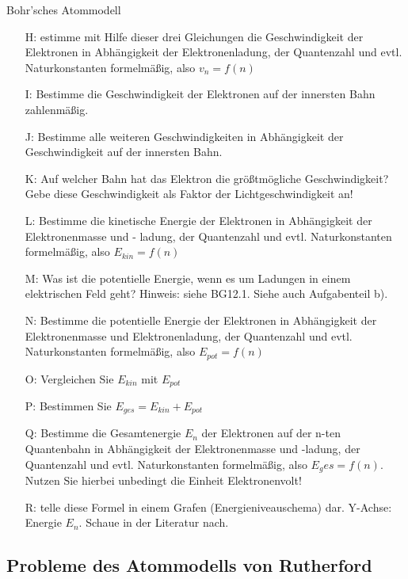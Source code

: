 \documentclass[11pt,a4paper,oneside]{article}
\begin{document}
\begin{aufgabe}{Bohr'sches Atommodell}
\begin{itemize}[left=20mm]
\begin{itemize}[left=-10mm]
				\item [H:] estimme mit Hilfe dieser drei Gleichungen die Geschwindigkeit der Elektronen in Abhängigkeit der Elektronenladung, der Quantenzahl und evtl. Naturkonstanten formelmäßig, also $v_n = f(n)$
				\item [I:] Bestimme die Geschwindigkeit der Elektronen auf der innersten Bahn zahlenmäßig.
				\item [J:] Bestimme alle weiteren Geschwindigkeiten in Abhängigkeit der Geschwindigkeit auf der innersten Bahn.
			    \item [K:] Auf welcher Bahn hat das Elektron die größtmögliche Geschwindigkeit? Gebe diese Geschwindigkeit als Faktor der Lichtgeschwindigkeit an!
				\item [L:] Bestimme die kinetische Energie der Elektronen in Abhängigkeit der Elektronenmasse und -
				ladung, der Quantenzahl und evtl. Naturkonstanten formelmäßig, also $E_{kin} = f(n)$
				
				\newpage
				
				\item [M:] Was ist die potentielle Energie, wenn es um Ladungen in einem elektrischen Feld geht? Hinweis:
				siehe BG12.1. Siehe auch Aufgabenteil b).
				\item [N:] Bestimme die potentielle Energie der Elektronen in Abhängigkeit der Elektronenmasse und Elektronenladung, der Quantenzahl und evtl. Naturkonstanten formelmäßig, also $E_{pot} = f(n)$
				\item [O:] Vergleichen Sie $E_{kin}$ mit $E_{pot}$
				\item [P:] Bestimmen Sie $E_{ges} = E_{kin} + E_{pot}$ 
				\item [Q:] Bestimme die Gesamtenergie $E_n$ der Elektronen auf der n-ten Quantenbahn in Abhängigkeit der
				Elektronenmasse und -ladung, der Quantenzahl und evtl. Naturkonstanten formelmäßig, also $E_ges = f(n)$. Nutzen Sie hierbei unbedingt die Einheit Elektronenvolt!
				\item [R:] telle diese Formel in einem Grafen (Energieniveauschema) dar. Y-Achse: Energie $E_n$. Schaue in
				der Literatur nach.		
			\end{itemize}
		\end{itemize}
	\end{aufgabe}
	
	
	
	\newpage
	
	
	\subsection{Probleme des Atommodells von Rutherford}
	
\end{document}
